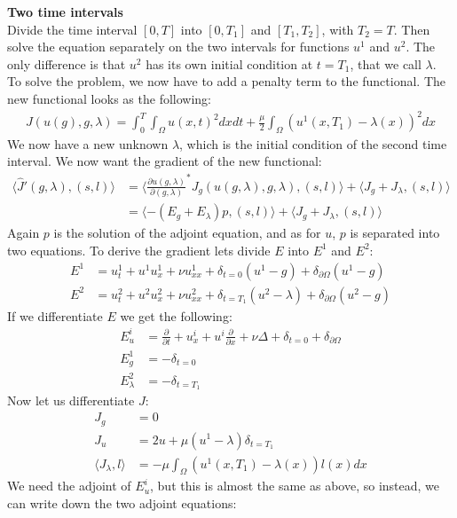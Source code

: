 \documentclass[11pt,a4paper]{report}
\begin{document}
\textbf{Two time intervals}
\\
Divide the time interval $[0,T]$ into $[0,T_1]$ and $[T_1,T_2]$, with $T_2=T$. Then solve the equation separately on the two intervals for functions $u^1$ and $u^2$. The only difference is that $u^2$ has its own initial condition at $t=T_1$, that we call $\lambda$. To solve the problem, we now have to add a penalty term to the functional. The new functional looks as the following:
\begin{align*}
J(u(g),g,\lambda) = \int_0^T\int_{\Omega} u(x,t)^2 dxdt + \frac{\mu}{2}\int_{\Omega} (u^1(x,T_1)-\lambda(x))^2dx
\end{align*} 
We now have a new unknown $\lambda$, which is the initial condition of the second time interval. We now want the gradient of the new functional:
\begin{align*}
\langle \hat{J}'(g,\lambda), (s,l)\rangle &= \langle \frac{\partial u(g,\lambda)}{\partial(g,\lambda)}^* J_g(u(g,\lambda),g,\lambda), (s,l)\rangle + \langle J_g+J_{\lambda}, (s,l)\rangle \\
&=\langle -(E_g+E_{\lambda})p , (s,l)\rangle + \langle J_g+J_{\lambda}, (s,l)\rangle
\end{align*}
Again $p$ is the solution of the adjoint equation, and as for $u$, $p$ is separated into two equations. To derive the gradient lets divide $E$ into $E^1$ and $E^2$:
\begin{align*}
E^1 &= u_t^1 + u^1u_x^1 + \nu u_{xx}^1 +\delta_{t=0}(u^1-g) + \delta_{\partial \Omega}(u^1-g)\\
E^2 &= u_t^2 + u^2u_x^2 + \nu u_{xx}^2 +\delta_{t=T_1}(u^2-\lambda) + \delta_{\partial \Omega}(u^2-g)
\end{align*} 
If we differentiate $E$ we get the following:
\begin{align*}
E_u^i&=\frac{\partial}{\partial t} + u_x^i + u^i\frac{\partial}{\partial x} + \nu\Delta + \delta_{t=0} + \delta_{\partial \Omega} \\
E_g^1 &= -\delta_{t=0} \\
E_{\lambda}^2 &= -\delta_{t=T_1}
\end{align*}
Now let us differentiate $J$:
\begin{align*}
J_g &= 0 \\
J_u &= 2u + \mu(u^1-\lambda)\delta_{t=T_1}\\
\langle J_{\lambda},l\rangle &= -\mu\int_{\Omega} (u^1(x,T_1)-\lambda(x))l(x)dx
\end{align*}
We need the adjoint of $E_u^i$, but this is almost the same as above, so instead, we can write down the two adjoint equations:
\end{document}
